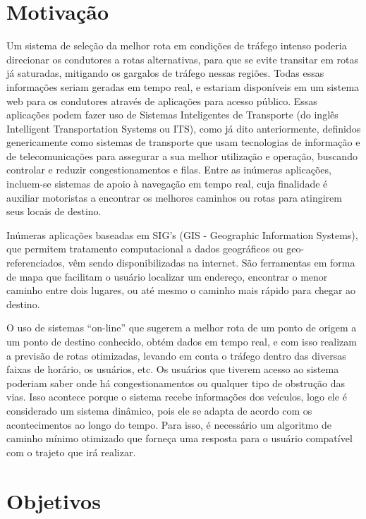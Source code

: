 \section{Motivação}

Um sistema de seleção da melhor rota em condições de tráfego intenso poderia
direcionar os condutores a rotas alternativas, para que se evite transitar em rotas já saturadas,
mitigando os gargalos de tráfego nessas regiões. Todas essas informações seriam
geradas em tempo real, e estariam disponíveis em um sistema web para os condutores através de aplicações para acesso público.
Essas aplicações podem fazer uso de Sistemas Inteligentes de Transporte (do inglês Intelligent Transportation Systems ou ITS),
como já dito anteriormente, definidos genericamente como sistemas de transporte que usam tecnologias de informação e
de telecomunicações para assegurar a sua melhor utilização e operação, buscando controlar e
reduzir congestionamentos e filas. Entre as inúmeras aplicações, incluem-se sistemas de apoio
à navegação em tempo real, cuja finalidade é auxiliar motoristas a encontrar os melhores
caminhos ou rotas para atingirem seus locais de destino.

Inúmeras aplicações baseadas em SIG’s (GIS - Geographic Information Systems),
que permitem tratamento computacional a dados geográficos ou geo-referenciados,
vêm sendo disponibilizadas na internet.
São ferramentas em forma de mapa que facilitam o usuário localizar um endereço,
encontrar o menor caminho entre dois lugares, ou até mesmo o caminho mais rápido para chegar ao destino.

O uso de sistemas ``on-line'' que sugerem a melhor rota de um ponto de origem a um ponto de destino conhecido,
obtém dados em tempo real, e com isso realizam a previsão de rotas otimizadas, levando em conta o tráfego
dentro das diversas faixas de horário, os usuários, etc.
Os usuários que tiverem acesso ao sistema poderiam saber onde há congestionamentos ou qualquer tipo de obstrução das vias.
Isso acontece porque o sistema recebe informações dos veículos, logo ele é considerado um sistema dinâmico,
pois ele se adapta de acordo com os acontecimentos ao longo do tempo.
Para isso, é necessário um algoritmo de caminho mínimo otimizado que forneça uma resposta para o usuário compatível
com o trajeto que irá realizar.

\section{Objetivos}

